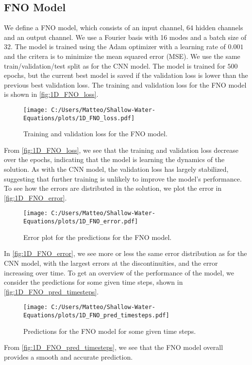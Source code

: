 \subsection*{FNO Model}
We define a FNO model, which consists of an input channel, 64 hidden channels and an output channel. We use a Fourier basis with 16 modes and a batch size of 32.
The model is trained using the Adam optimizer with a learning rate of $0.001$ and the critera is to minimize the mean squared error (MSE).
We use the same train/validation/test split as for the CNN model.
The model is trained for $500$ epochs, but the current best model is saved if the validation loss is lower than the previous best validation loss.
The training and validation loss for the FNO model is shown in \autoref{fig:1D_FNO_loss}.
\begin{figure}[H]
    \centering
    \texttt{[image: C:/Users/Matteo/Shallow-Water-Equations/plots/1D\_FNO\_loss.pdf]}
    \caption{Training and validation loss for the FNO model.}\label{fig:1D_FNO_loss}
\end{figure}
From \autoref{fig:1D_FNO_loss}, we see that the training and validation loss decrease over the epochs, indicating that the model is learning the dynamics of the solution.
As with the CNN model, the validation loss has largely stabilized, suggesting that further training is unlikely to improve the model's performance.
To see how the errors are distributed in the solution, we plot the error in \autoref{fig:1D_FNO_error}.
\begin{figure}[H]
    \centering
    \texttt{[image: C:/Users/Matteo/Shallow-Water-Equations/plots/1D\_FNO\_error.pdf]}
    \caption{Error plot for the predictions for the FNO model.}\label{fig:1D_FNO_error}
\end{figure}
In \autoref{fig:1D_FNO_error}, we see more or less the same error distribution as for the CNN model, with the largest errors at the discontinuities, and the error increasing over time.
To get an overview of the performance of the model, we consider the predictions for some given time steps, shown in \autoref{fig:1D_FNO_pred_timesteps}.
\begin{figure}[H]
    \centering
    \texttt{[image: C:/Users/Matteo/Shallow-Water-Equations/plots/1D\_FNO\_pred\_timesteps.pdf]}
    \caption{Predictions for the FNO model for some given time steps.}\label{fig:1D_FNO_pred_timesteps}
\end{figure}
From \autoref{fig:1D_FNO_pred_timesteps}, we see that the FNO model overall provides a smooth and accurate prediction.

